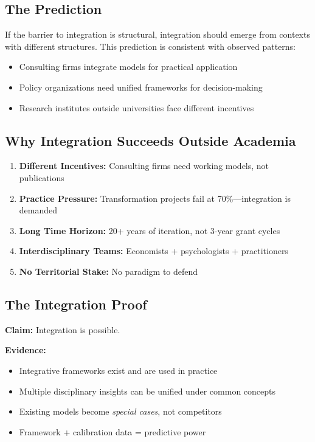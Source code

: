 \documentclass[12pt,a4paper]{article}
\begin{document}
\subsection{The Prediction}

If the barrier to integration is structural, integration should emerge from contexts with different structures. This prediction is consistent with observed patterns:

\begin{itemize}[nosep]
\item Consulting firms integrate models for practical application
\item Policy organizations need unified frameworks for decision-making
\item Research institutes outside universities face different incentives
\end{itemize}

\subsection{Why Integration Succeeds Outside Academia}

\begin{enumerate}
\item \textbf{Different Incentives:} Consulting firms need working models, not publications
\item \textbf{Practice Pressure:} Transformation projects fail at 70\%---integration is demanded
\item \textbf{Long Time Horizon:} 20+ years of iteration, not 3-year grant cycles
\item \textbf{Interdisciplinary Teams:} Economists + psychologists + practitioners
\item \textbf{No Territorial Stake:} No paradigm to defend
\end{enumerate}

\subsection{The Integration Proof}

\textbf{Claim:} Integration is possible.

\textbf{Evidence:}
\begin{itemize}
\item Integrative frameworks exist and are used in practice
\item Multiple disciplinary insights can be unified under common concepts
\item Existing models become \textit{special cases}, not competitors
\item Framework + calibration data = predictive power
\end{itemize}
\end{document}

